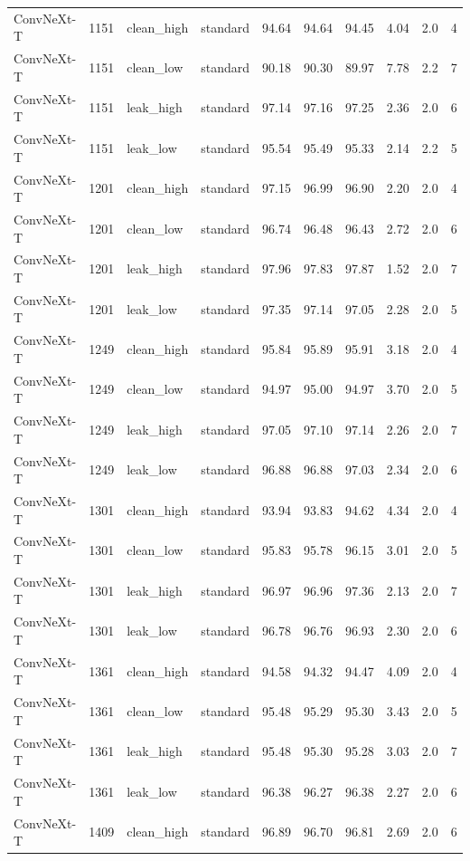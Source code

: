 {\begin{longtable}{lrllrrrrrr}
ConvNeXt-T & 1151 & clean\_high & standard & 94.64 & 94.64 & 94.45 & 4.04 & 2.0 & 4 \\
ConvNeXt-T & 1151 & clean\_low & standard & 90.18 & 90.30 & 89.97 & 7.78 & 2.2 & 7 \\
ConvNeXt-T & 1151 & leak\_high & standard & 97.14 & 97.16 & 97.25 & 2.36 & 2.0 & 6 \\
ConvNeXt-T & 1151 & leak\_low & standard & 95.54 & 95.49 & 95.33 & 2.14 & 2.2 & 5 \\
ConvNeXt-T & 1201 & clean\_high & standard & 97.15 & 96.99 & 96.90 & 2.20 & 2.0 & 4 \\
ConvNeXt-T & 1201 & clean\_low & standard & 96.74 & 96.48 & 96.43 & 2.72 & 2.0 & 6 \\
ConvNeXt-T & 1201 & leak\_high & standard & 97.96 & 97.83 & 97.87 & 1.52 & 2.0 & 7 \\
ConvNeXt-T & 1201 & leak\_low & standard & 97.35 & 97.14 & 97.05 & 2.28 & 2.0 & 5 \\
ConvNeXt-T & 1249 & clean\_high & standard & 95.84 & 95.89 & 95.91 & 3.18 & 2.0 & 4 \\
ConvNeXt-T & 1249 & clean\_low & standard & 94.97 & 95.00 & 94.97 & 3.70 & 2.0 & 5 \\
ConvNeXt-T & 1249 & leak\_high & standard & 97.05 & 97.10 & 97.14 & 2.26 & 2.0 & 7 \\
ConvNeXt-T & 1249 & leak\_low & standard & 96.88 & 96.88 & 97.03 & 2.34 & 2.0 & 6 \\
ConvNeXt-T & 1301 & clean\_high & standard & 93.94 & 93.83 & 94.62 & 4.34 & 2.0 & 4 \\
ConvNeXt-T & 1301 & clean\_low & standard & 95.83 & 95.78 & 96.15 & 3.01 & 2.0 & 5 \\
ConvNeXt-T & 1301 & leak\_high & standard & 96.97 & 96.96 & 97.36 & 2.13 & 2.0 & 7 \\
ConvNeXt-T & 1301 & leak\_low & standard & 96.78 & 96.76 & 96.93 & 2.30 & 2.0 & 6 \\
ConvNeXt-T & 1361 & clean\_high & standard & 94.58 & 94.32 & 94.47 & 4.09 & 2.0 & 4 \\
ConvNeXt-T & 1361 & clean\_low & standard & 95.48 & 95.29 & 95.30 & 3.43 & 2.0 & 5 \\
ConvNeXt-T & 1361 & leak\_high & standard & 95.48 & 95.30 & 95.28 & 3.03 & 2.0 & 7 \\
ConvNeXt-T & 1361 & leak\_low & standard & 96.38 & 96.27 & 96.38 & 2.27 & 2.0 & 6 \\
ConvNeXt-T & 1409 & clean\_high & standard & 96.89 & 96.70 & 96.81 & 2.69 & 2.0 & 6 \\

\end{longtable}}
